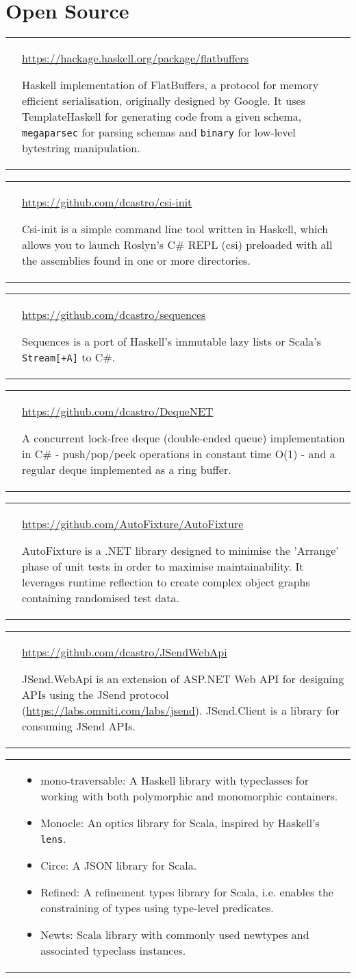 \documentclass[12pt,a4paper,sans]{moderncv}        %
\makeatletter
\newcommand*{\para}{\vspace{.7ex}\newline}
\newcommand*{\project}[3]{
  \cvitem{\textbf{#1}}{
    \barelink{#2}
    \para
    #3
    }
}
\newcommand*{\code}{\texttt}
\newcommand*{\barelink}[1]{\protect\href{#1}{#1}}
\newcommand*{\cvitemspace}{1em}
\renewcommand*{\cvitem}[3][\cvitemspace]{%
  \begin{tabular}{@{}p{\hintscolumnwidth}@{\hspace{\separatorcolumnwidth}}p{\maincolumnwidth}@{}}%
    \raggedleft\hintstyle{#2} &{#3}%
  \end{tabular}%
  \par\addvspace{#1}}
\makeatother
\begin{document}
\clearpage

\section{Open Source}
\project{haskell-flatbuffers}{https://hackage.haskell.org/package/flatbuffers}{
  Haskell implementation of FlatBuffers, a protocol for memory efficient
  serialisation, originally designed by Google.
  It uses TemplateHaskell for generating code from a given schema,
  \code{megaparsec} for parsing schemas and \code{binary} for low-level
  bytestring manipulation.
}
\project{csi-init}{https://github.com/dcastro/csi-init}{
  Csi-init is a simple command line tool written in Haskell, which allows you to
  launch Roslyn's C\# REPL (csi) preloaded with all the assemblies found in one or
  more directories.
}
\project{sequences}{https://github.com/dcastro/sequences}{
  Sequences is a port of Haskell's immutable lazy lists or Scala's \code{Stream[+A]} to C\#.
}
\project{DequeNET}{https://github.com/dcastro/DequeNET}{
  A concurrent lock-free deque (double-ended queue) implementation in C\# -
  push/pop/peek operations in constant time O(1) - and a regular deque
  implemented as a ring buffer.
}
\project{Contributed to AutoFixture}{https://github.com/AutoFixture/AutoFixture}{
  AutoFixture is a .NET library designed to minimise the
  'Arrange' phase of unit tests in order to maximise maintainability.
  It leverages runtime reflection to create complex object graphs
  containing randomised test data.
}
\project{JSend WebApi \& Client}{https://github.com/dcastro/JSendWebApi}{
  JSend.WebApi is an extension of ASP.NET Web API for designing APIs using the
  JSend protocol (\barelink{https://labs.omniti.com/labs/jsend}).
  JSend.Client is a library for consuming JSend APIs.
}
\cvitem{\textbf{Smaller contributions}}{
  \begin{itemize}
    \item mono-traversable: A Haskell library with typeclasses for working with
    both polymorphic and monomorphic containers.
    \item Monocle: An optics library for Scala, inspired by Haskell's \code{lens}.
    \item Circe: A JSON library for Scala.
    \item Refined: A refinement types library for Scala, i.e. enables
    the constraining of types using type-level predicates.
    \item Newts: Scala library with commonly used newtypes and associated typeclass instances.
  \end{itemize}
}
\end{document}

